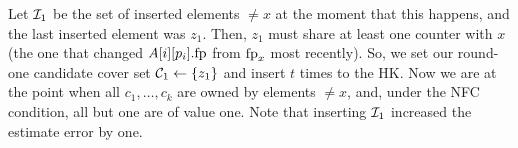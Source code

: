 Let $\mathcal{I}_1$ be the set of inserted elements $\not= x$ at the moment that this happens, and the last inserted element was $z_1$. Then, $z_1$ must share at least one counter with $x$ (the one that changed $A[i][p_i].\textup{fp}$ from $\textup{fp}_x$ most recently). So, we set our round-one candidate cover set $\mathcal{C}_1\gets \{z_1\}$ and insert $t$ times to the HK. Now we are at the point when all $c_1, \dots, c_k$ are owned by elements $\neq x$, and, under the NFC condition, all but one are of value one. Note that inserting $\mathcal{I}_1$ increased the estimate error by one.
\begin{figure*}[ht!]
	\centering
	\begin{pchstack}[boxed,center,space=0.5em]
		\begin{pcvstack}
		\end{pcvstack}
		\begin{pcvstack}[space=0.45em]
\end{pcvstack}
\end{pchstack}
\end{figure*}
